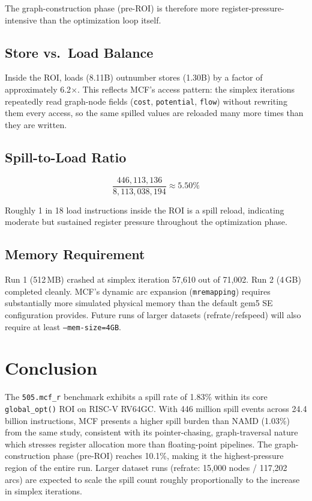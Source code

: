 \documentclass[conference]{IEEEtran}
\begin{document}
The graph-construction phase (pre-ROI) is therefore more
register-pressure-intensive than the optimization loop itself.

\subsection{Store vs.\ Load Balance}

Inside the ROI, loads (8.11B) outnumber stores (1.30B) by a factor
of approximately 6.2$\times$. This reflects MCF's access pattern:
the simplex iterations repeatedly read graph-node fields
(\texttt{cost}, \texttt{potential}, \texttt{flow}) without rewriting
them every access, so the same spilled values are reloaded many more
times than they are written.

\subsection{Spill-to-Load Ratio}

\[
\frac{446{,}113{,}136}{8{,}113{,}038{,}194} \approx 5.50\%
\]

Roughly 1 in 18 load instructions inside the ROI is a spill reload,
indicating moderate but sustained register pressure throughout the
optimization phase.

\subsection{Memory Requirement}

Run 1 (512\,MB) crashed at simplex iteration 57,610 out of 71,002.
Run 2 (4\,GB) completed cleanly. MCF's dynamic arc expansion
(\texttt{mremapping}) requires substantially more simulated physical
memory than the default gem5 SE configuration provides.
Future runs of larger datasets (refrate/refspeed) will also
require at least \texttt{--mem-size=4GB}.

\section{Conclusion}

The \texttt{505.mcf\_r} benchmark exhibits a spill rate of 1.83\%
within its core \texttt{global\_opt()} ROI on RISC-V RV64GC.
With 446 million spill events across 24.4 billion instructions,
MCF presents a higher spill burden than NAMD (1.03\%) from the same
study, consistent with its pointer-chasing, graph-traversal nature
which stresses register allocation more than floating-point pipelines.
The graph-construction phase (pre-ROI) reaches 10.1\%, making it
the highest-pressure region of the entire run.
Larger dataset runs (refrate: 15,000 nodes / 117,202 arcs) are
expected to scale the spill count roughly proportionally to the
increase in simplex iterations.
\end{document}
